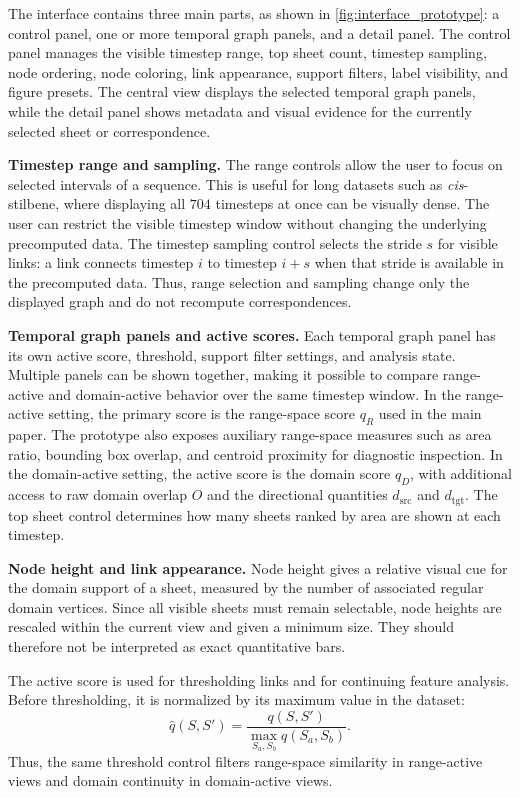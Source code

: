 \documentclass[review]{vgtc}
\newcommand{\Sheet}{S}
\newcommand{\myparagraph}[1]{\vspace{1mm} \noindent \textbf{#1}}
\begin{document}
The interface contains three main parts, as shown in \autoref{fig:interface_prototype}: a control panel, one or more temporal graph panels, and a detail panel. The control panel manages the visible timestep range, top sheet count, timestep sampling, node ordering, node coloring, link appearance, support filters, label visibility, and figure presets. The central view displays the selected temporal graph panels, while the detail panel shows metadata and visual evidence for the currently selected sheet or correspondence.

\myparagraph{Timestep range and sampling.}
The range controls allow the user to focus on selected intervals of a sequence. This is useful for long datasets such as \textit{cis}-stilbene, where displaying all $704$ timesteps at once can be visually dense. The user can restrict the visible timestep window without changing the underlying precomputed data. The timestep sampling control selects the stride $s$ for visible links: a link connects timestep $i$ to timestep $i+s$ when that stride is available in the precomputed data. Thus, range selection and sampling change only the displayed graph and do not recompute correspondences.

\myparagraph{Temporal graph panels and active scores.}
Each temporal graph panel has its own active score, threshold, support filter settings, and analysis state. Multiple panels can be shown together, making it possible to compare range-active and domain-active behavior over the same timestep window. In the range-active setting, the primary score is the range-space score $q_R$ used in the main paper. The prototype also exposes auxiliary range-space measures such as area ratio, bounding box overlap, and centroid proximity for diagnostic inspection. In the domain-active setting, the active score is the domain score $q_D$, with additional access to raw domain overlap $O$ and the directional quantities $d_\mathrm{src}$ and $d_\mathrm{tgt}$. The top sheet control determines how many sheets ranked by area are shown at each timestep.

\myparagraph{Node height and link appearance.}
Node height gives a relative visual cue for the domain support of a sheet, measured by the number of associated regular domain vertices. Since all visible sheets must remain selectable, node heights are rescaled within the current view and given a minimum size. They should therefore not be interpreted as exact quantitative bars.

The active score is used for thresholding links and for continuing feature analysis. Before thresholding, it is normalized by its maximum value in the dataset:
$$
\widehat{q}(\Sheet,\Sheet') =
\frac{q(\Sheet,\Sheet')}
{\max_{\Sheet_a,\Sheet_b} q(\Sheet_a,\Sheet_b)}.
$$
Thus, the same threshold control filters range-space similarity in range-active views and domain continuity in domain-active views.
\end{document}
